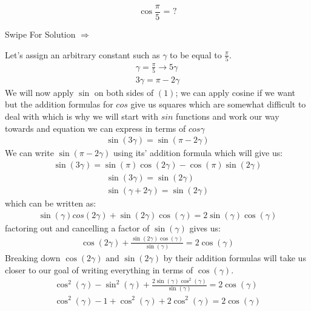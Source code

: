 \documentclass{article}
\begin{document}
\Huge
\pagecolor{Velvety Red}
\begin{equation}
    \cos{\frac{\pi}{5}} \text{ =} \text{ ?} \nonumber
\end{equation}
\newline
\begin{center}
Swipe For Solution $\Rightarrow$
\end{center}
\newpage
\normalsize
\noindent Let's assign an arbitrary constant such as $\gamma$ to be equal to $\frac{\pi}{5}$.
\begin{eqnarray}
\gamma = \frac{\pi}{5} \to
5\gamma\nonumber \\ 3\gamma = \pi -2\gamma
\end{eqnarray}
We will now apply $\sin{}$ on both sides of  $(1)$; we can apply cosine if we want but the addition formulas for $cos{}$ give us squares which are somewhat difficult to deal with which is why we will start with $sin{}$ functions and work our way towards and equation we can express in terms of $cos{\gamma}$
\begin{eqnarray}
\sin{(3\gamma)} = \sin{(\pi-2\gamma)}\nonumber
\end{eqnarray}
We can write $\sin{(\pi-2\gamma)}$ using its' addition formula which will give us:
\begin{eqnarray}
\sin{(3\gamma)} = \sin{(\pi)}\cos{(2\gamma)}-\cos{(\pi)}\sin{(2\gamma)}\nonumber
\end{eqnarray}
\begin{eqnarray}
\sin{(3\gamma)} = \sin{(2\gamma)} \nonumber\\
\sin{(\gamma + 2\gamma)} = \sin{(2\gamma)}\nonumber
\end{eqnarray}
which can be written as:
\begin{eqnarray}
\sin{(\gamma)}cos{(2\gamma)}+\sin{(2\gamma)}\cos{(\gamma)}=2\sin{(\gamma)}\cos{(\gamma)}\nonumber
\end{eqnarray}
factoring out and cancelling a factor of $\sin{(\gamma)}$ gives us:
\begin{eqnarray}
\cos{(2\gamma)} + \frac{\sin{(2\gamma)}\cos{(\gamma)}}{\sin{(\gamma)}}=2\cos{(\gamma)}\nonumber
\end{eqnarray}
Breaking down $\cos{(2\gamma)} \text{ and } \sin{(2\gamma)}$ by their addition formulas will take us closer to our goal of writing everything in terms of $\cos{(\gamma)}$.
\begin{eqnarray}
\cos^{2}{(\gamma)}-\sin^{2}{(\gamma)}+ \frac{2\sin{(\gamma)}\cos^2{(\gamma)}}{\sin{(\gamma)}}=2\cos{(\gamma)}\nonumber\\
\cos^2{(\gamma)} -1+\cos^2{(\gamma)} + 2\cos^2{(\gamma)} = 2\cos{(\gamma)}\nonumber
\end{eqnarray}
\end{document}
